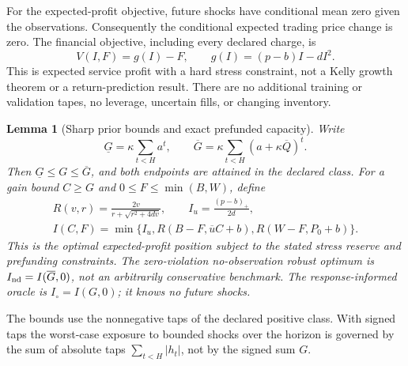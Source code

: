 \documentclass[12pt]{article}
\newtheorem{lemma}[theorem]{Lemma}
\theoremstyle{definition}
\theoremstyle{remark}
\begin{document}
For the expected-profit objective, future shocks have conditional mean zero
given the observations. Consequently the conditional expected trading price
change is zero. The financial objective, including every declared charge, is
\[
 V(I,F)=g(I)-F,\qquad g(I)=(p-b)I-dI^2.
\]
This is expected service profit with a hard stress constraint, not a Kelly
growth theorem or a return-prediction result. There are no additional training
or validation tapes, no leverage, uncertain fills, or changing inventory.

\begin{lemma}[Sharp prior bounds and exact prefunded capacity]\label{fhc:capacity}
Write
\[
 \underline G=\kappa\sum_{t<H}a^t,\qquad
 \overline G=\kappa\sum_{t<H}(a+\kappa\overline Q)^t.
\]
Then $\underline G\le G\le\overline G$, and both endpoints are attained
in the declared class. For a gain bound $C\ge G$ and
$0\le F\le\min(B,W)$, define
\[
 \begin{gathered}
 R(v,r)=\frac{2v}{r+\sqrt{r^2+4dv}},\qquad I_u=\frac{(p-b)_+}{2d},\\
 I(C,F)=\min\{I_u,R(B-F,\overline u C+b),R(W-F,P_0+b)\}.
 \end{gathered}
\]
This is the optimal expected-profit position subject to the stated stress
reserve and prefunding constraints. The zero-violation no-observation robust optimum is
$I_{\rm nd}=I(\overline G,0)$, not an arbitrarily conservative benchmark.
The response-informed oracle is $I_\circ=I(G,0)$; it knows no future shocks.
\end{lemma}
The bounds use the nonnegative taps of the declared positive class. With signed taps the worst-case exposure to bounded shocks over the horizon is governed by the sum of absolute taps $\sum_{t<H}|h_t|$, not by the signed sum $G$.
\end{document}
